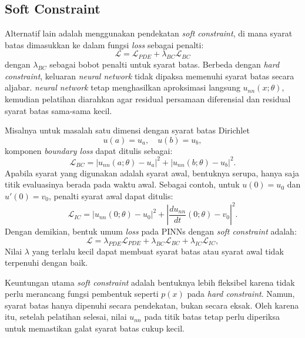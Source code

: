 \documentclass[12pt, letterpaper]{article}
\begin{document}
\subsection{Soft Constraint}
Alternatif lain adalah menggunakan pendekatan \textit{soft constraint}, di mana
syarat batas dimasukkan ke dalam fungsi \textit{loss} sebagai penalti:
\begin{equation}
    \mathcal{L} = \mathcal{L}_{PDE} + \lambda_{BC}\mathcal{L}_{BC}
\end{equation}
dengan $\lambda_{BC}$ sebagai bobot penalti untuk syarat batas. Berbeda dengan
\textit{hard constraint}, keluaran \textit{neural network} tidak dipaksa memenuhi syarat batas
secara aljabar. \textit{neural network} tetap menghasilkan aproksimasi langsung
$u_{nn}(x;\theta)$, kemudian pelatihan diarahkan agar residual persamaan diferensial dan residual
syarat batas sama-sama kecil.

Misalnya untuk masalah satu dimensi dengan syarat batas Dirichlet
\begin{equation}
    u(a) = u_a, \quad u(b) = u_b,
\end{equation}
komponen \textit{boundary loss} dapat ditulis sebagai:
\begin{equation}
    \mathcal{L}_{BC}
    =
    \left|u_{nn}(a;\theta) - u_a\right|^2
    +
    \left|u_{nn}(b;\theta) - u_b\right|^2.
\end{equation}
Apabila syarat yang digunakan adalah syarat awal, bentuknya serupa, hanya saja
titik evaluasinya berada pada waktu awal. Sebagai contoh, untuk
$u(0)=u_0$ dan $u'(0)=v_0$, penalti syarat awal dapat ditulis:
\begin{equation}
    \mathcal{L}_{IC}
    =
    \left|u_{nn}(0;\theta) - u_0\right|^2
    +
    \left|\frac{d u_{nn}}{dt}(0;\theta) - v_0\right|^2.
\end{equation}
Dengan demikian, bentuk umum \textit{loss} pada PINNs dengan
\textit{soft constraint} adalah:
\begin{equation}
    \mathcal{L}
    =
    \lambda_{PDE}\mathcal{L}_{PDE}
    +
    \lambda_{BC}\mathcal{L}_{BC}
    +
    \lambda_{IC}\mathcal{L}_{IC},
\end{equation}
Nilai $\lambda$ yang terlalu kecil dapat membuat syarat batas atau syarat awal tidak terpenuhi dengan baik.

Keuntungan utama \textit{soft constraint} adalah bentuknya lebih fleksibel
karena tidak perlu merancang fungsi pembentuk seperti $p(x)$ pada
\textit{hard constraint}. Namun, syarat batas hanya dipenuhi secara pendekatan,
bukan secara eksak. Oleh karena itu, setelah pelatihan selesai, nilai
$u_{nn}$ pada titik batas tetap perlu diperiksa untuk memastikan galat syarat
batas cukup kecil.
\end{document}
